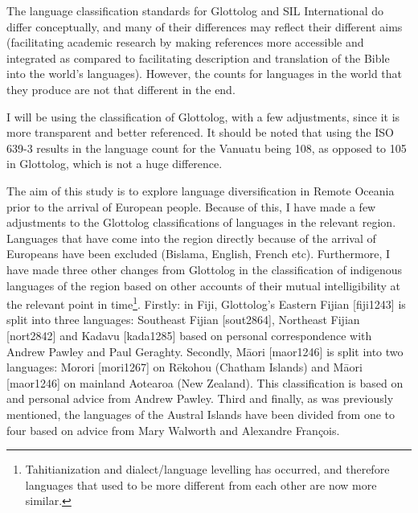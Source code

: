 \documentclass[12pt,letterpaper]{article}
\begin{document}
The language classification standards for Glottolog and SIL International do differ conceptually, and many of their differences may reflect their different aims (facilitating academic research by making references more accessible and integrated as compared to facilitating description and translation of the Bible into the world's languages). However, the counts for languages in the world that they produce are not that different in the end.

I will be using the classification of Glottolog, with a few adjustments, since it is more transparent and better referenced. It should be noted that using the ISO 639-3 results in the language count for the Vanuatu being 108, as opposed to 105 in Glottolog, which is not a huge difference. 

The aim of this study is to explore language diversification in Remote Oceania prior to the arrival of European people. Because of this, I have made a few adjustments to the Glottolog classifications of languages in the relevant region. Languages that have come into the region directly because of the arrival of Europeans have been excluded (Bislama, English, French etc). Furthermore, I have made three other changes from Glottolog in the classification of indigenous languages of the region based on other accounts of their mutual intelligibility at the relevant point in time\footnote{Tahitianization and dialect/language levelling has occurred, and therefore languages that used to be more different from each other are now more similar.}. Firstly: in Fiji, Glottolog's Eastern Fijian [fiji1243] is split into three languages: Southeast Fijian [sout2864], Northeast Fijian [nort2842] and Kadavu [kada1285] based on personal correspondence with Andrew Pawley and Paul Geraghty. Secondly, M\={a}ori [maor1246] is split into two languages: Morori [mori1267] on R\={e}kohou (Chatham Islands) and M\={a}ori [maor1246] on mainland Aotearoa (New Zealand). This classification is based on \citet{harlow1973regional} and personal advice from Andrew Pawley. Third and finally, as was previously mentioned, the languages of the Austral Islands have been divided from one to four based on advice from Mary Walworth and Alexandre François.
\end{document}
